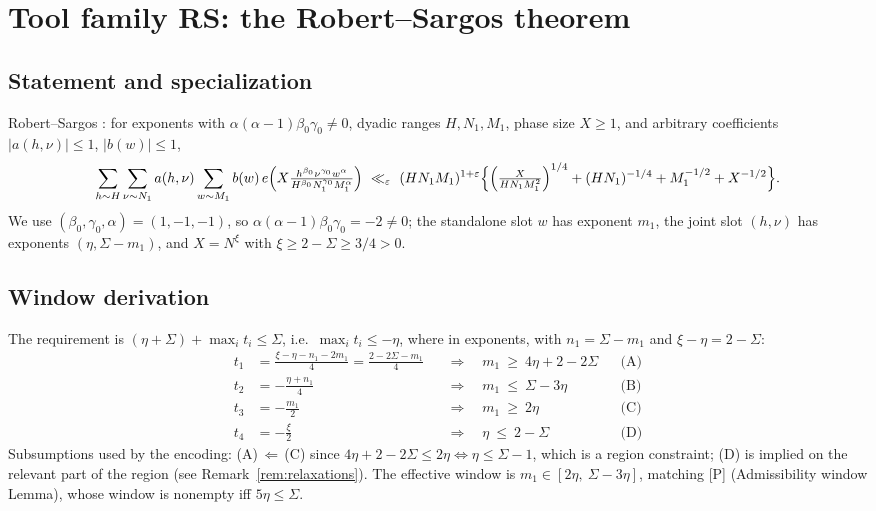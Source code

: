 \documentclass[11pt]{article}
\theoremstyle{remark}
\newcommand{\N}{N}
\newcommand{\eof}[1]{e\!\left(#1\right)}
\begin{document}
\section{Tool family RS: the Robert--Sargos theorem}\label{sec:RS}

\subsection{Statement and specialization}
Robert--Sargos \cite[Theorem~1]{RS}: for exponents with
$\alpha(\alpha-1)\beta_0\gamma_0\ne0$, dyadic ranges $H,N_1,M_1$, phase
size $X\ge1$, and arbitrary coefficients $|a(h,\nu)|\le1$, $|b(w)|\le1$,
\[
\sum_{h\sim H}\sum_{\nu\sim N_1}a(h,\nu)\sum_{w\sim M_1}b(w)\,
\eof{X\tfrac{h^{\beta_0}\nu^{\gamma_0}w^{\alpha}}
{H^{\beta_0}N_1^{\gamma_0}M_1^{\alpha}}}
\ \ll_{\varepsilon}\ (HN_1M_1)^{1+\varepsilon}
\Bigl\{\Bigl(\tfrac{X}{HN_1M_1^{2}}\Bigr)^{1/4}
+(HN_1)^{-1/4}+M_1^{-1/2}+X^{-1/2}\Bigr\}.
\]
We use $(\beta_0,\gamma_0,\alpha)=(1,-1,-1)$, so
$\alpha(\alpha-1)\beta_0\gamma_0=-2\ne0$; the standalone slot $w$ has
exponent $m_1$, the joint slot $(h,\nu)$ has exponents
$(\eta,\Sigma-m_1)$, and $X=\N^{\xi}$ with $\xi\ge2-\Sigma\ge3/4>0$.

\subsection{Window derivation}\label{ssec:RSwindow}
The requirement is $(\eta+\Sigma)+\max_i t_i\le\Sigma$, i.e.\
$\max_i t_i\le-\eta$, where in exponents, with $n_1=\Sigma-m_1$ and
$\xi-\eta=2-\Sigma$:
\begin{align*}
t_1&=\tfrac{\xi-\eta-n_1-2m_1}{4}=\tfrac{2-2\Sigma-m_1}{4}
&&\Rightarrow\quad m_1\ \ge\ 4\eta+2-2\Sigma
&&\text{(A)}\\
t_2&=-\tfrac{\eta+n_1}{4}
&&\Rightarrow\quad m_1\ \le\ \Sigma-3\eta
&&\text{(B)}\\
t_3&=-\tfrac{m_1}{2}
&&\Rightarrow\quad m_1\ \ge\ 2\eta
&&\text{(C)}\\
t_4&=-\tfrac{\xi}{2}
&&\Rightarrow\quad \eta\ \le\ 2-\Sigma
&&\text{(D)}
\end{align*}
Subsumptions used by the encoding: (A)$\,\Leftarrow\,$(C) since
$4\eta+2-2\Sigma\le2\eta\iff\eta\le\Sigma-1$, which is a region
constraint; (D) is implied on the relevant part of the region (see
Remark~\ref{rem:relaxations}). The effective window is
$m_1\in[2\eta,\ \Sigma-3\eta]$, matching [P] (Admissibility window
Lemma), whose window is nonempty iff $5\eta\le\Sigma$.
\end{document}
